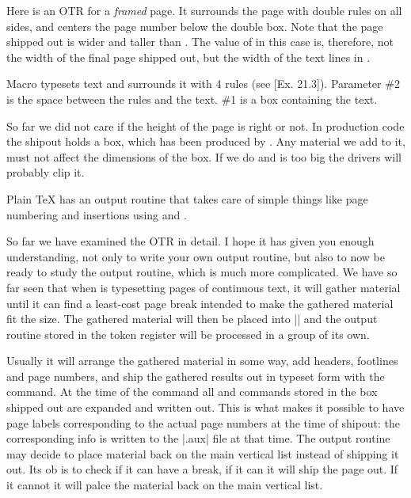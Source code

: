 Here is an OTR for a \textit{framed} page. It surrounds the
page with double rules on all sides, and centers the
page number below the double box. Note that the
page shipped out is wider and taller than .
The value of  in this case is, therefore, not
the width of the final page shipped out, but the
width of the text lines in .

Macro  typesets text and surrounds it
with 4 rules (see [Ex. 21.3]). Parameter \#2 is the
space between the rules and the text. \#1 is a box
containing the text.


 

So far we did not care if the height of the page is right or not. In production code the shipout holds
a box, which has been produced by \tex. Any material we add to it, must not affect the dimensions of the box.
If we do and is too big the drivers will probably clip it.


Plain TeX has an output routine that takes care of  simple things like page numbering and insertions
using  and . 


So far we have examined the \tex OTR in detail. I hope it has given you enough understanding, not only to write your own output routine, but also to now be ready to study the \latex output routine, which is much more complicated. We have so far seen that  when \tex 
is typesetting pages of continuous text, it will gather material until it can find a least-cost page break intended to
make the gathered material fit the  size. The
gathered material will then be placed into || and
the output routine stored in the token register 
will be processed in a group of its own. 

Usually it will
arrange the gathered material in some way, add headers,
footlines and page numbers, and ship the gathered results out in typeset form with the  command.
At the time of the  command all  and
 commands stored in the box shipped out are expanded and written out. This is what makes it possible to have page labels corresponding to the actual page
numbers at the time of shipout: the corresponding info
is written to the |.aux| file at that time.
The output routine may decide to place material
back on the main vertical list instead of shipping it out. Its ob is to check if it can have a break, if it can it will ship the page out. If it cannot it will palce the material back on the main vertical list. 

